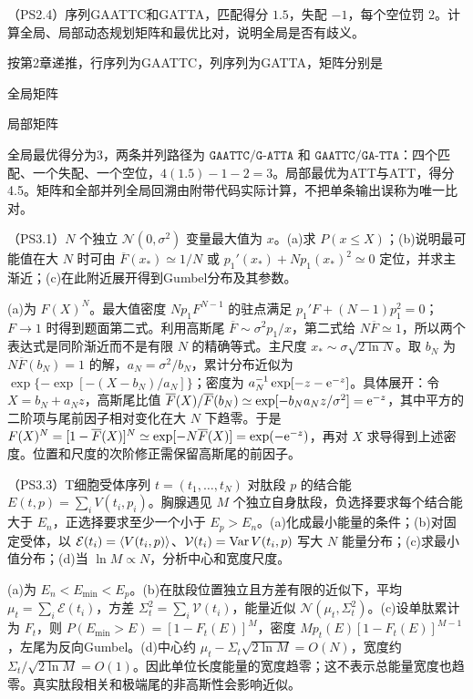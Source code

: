 \begin{exercise}
（PS2.4）序列GAATTC和GATTA，匹配得分 $1.5$，失配 $-1$，每个空位罚 $2$。计算全局、局部动态规划矩阵和最优比对，说明全局是否有歧义。
\end{exercise}
\begin{solution}
按第2章递推，行序列为GAATTC，列序列为GATTA，矩阵分别是
\begin{center}\par 全局矩阵\medskip\par\par 局部矩阵\end{center}
全局最优得分为3，两条并列路径为 $\texttt{GAATTC}/\texttt{G-ATTA}$ 和 $\texttt{GAATTC}/\texttt{GA-TTA}$：四个匹配、一个失配、一个空位，$4(1.5)-1-2=3$。局部最优为ATT与ATT，得分4.5。矩阵和全部并列全局回溯由附带代码实际计算，不把单条输出误称为唯一比对。
\end{solution}

\begin{exercise}
（PS3.1）$N$ 个独立 $\mathcal N(0,\sigma^2)$ 变量最大值为 $x$。(a)求 $P(x\le X)$；(b)说明最可能值在大 $N$ 时可由 $\overline F(x_*)\simeq1/N$ 或 $p_1'(x_*)+Np_1(x_*)^2\simeq0$ 定位，并求主渐近；(c)在此附近展开得到Gumbel分布及其参数。
\end{exercise}
\begin{solution}
(a)为 $F(X)^N$。最大值密度 $Np_1F^{N-1}$ 的驻点满足 $p_1'F+(N-1)p_1^2=0$；$F\to1$ 时得到题面第二式。利用高斯尾 $\overline F\sim\sigma^2p_1/x$，第二式给 $N\overline F\simeq1$，所以两个表达式是同阶渐近而不是有限 $N$ 的精确等式。主尺度 $x_*\sim\sigma\sqrt{2\ln N}$。取 $b_N$ 为 $N\overline F(b_N)=1$ 的解，$a_N=\sigma^2/b_N$，累计分布近似为 $\exp\{-\exp[-(X-b_N)/a_N]\}$；密度为 $a_N^{-1}\exp[-z-\mathrm e^{-z}]$。具体展开：令 $X=b_N+a_Nz$，高斯尾比值 $\overline F(X)/\overline F(b_N)\simeq\exp[-b_Na_Nz/\sigma^2]=\mathrm e^{-z}$，其中平方的二阶项与尾前因子相对变化在大 $N$ 下趋零。于是 $F(X)^N=[1-\overline F(X)]^N\simeq\exp[-N\overline F(X)]=\exp(-\mathrm e^{-z})$，再对 $X$ 求导得到上述密度。位置和尺度的次阶修正需保留高斯尾的前因子。
\end{solution}

\begin{exercise}
（PS3.3）T细胞受体序列 $t=(t_1,\ldots,t_N)$ 对肽段 $p$ 的结合能 $E(t,p)=\sum_iV(t_i,p_i)$。胸腺遇见 $M$ 个独立自身肽段，负选择要求每个结合能大于 $E_n$，正选择要求至少一个小于 $E_p>E_n$。(a)化成最小能量的条件；(b)对固定受体，以 $\mathcal E(t_i)=\langle V(t_i,p)\rangle$、$\mathcal V(t_i)=\operatorname{Var} V(t_i,p)$ 写大 $N$ 能量分布；(c)求最小值分布；(d)当 $\ln M\propto N$，分析中心和宽度尺度。
\end{exercise}
\begin{solution}
(a)为 $E_n<E_{\min}<E_p$。(b)在肽段位置独立且方差有限的近似下，平均 $\mu_t=\sum_i\mathcal E(t_i)$，方差 $\Sigma_t^2=\sum_i\mathcal V(t_i)$，能量近似 $\mathcal N(\mu_t,\Sigma_t^2)$。(c)设单肽累计为 $F_t$，则 $P(E_{\min}>E)=[1-F_t(E)]^M$，密度 $M p_t(E)[1-F_t(E)]^{M-1}$，左尾为反向Gumbel。(d)中心约 $\mu_t-\Sigma_t\sqrt{2\ln M}=O(N)$，宽度约 $\Sigma_t/\sqrt{2\ln M}=O(1)$。因此单位长度能量的宽度趋零；这不表示总能量宽度也趋零。真实肽段相关和极端尾的非高斯性会影响近似。
\end{solution}

